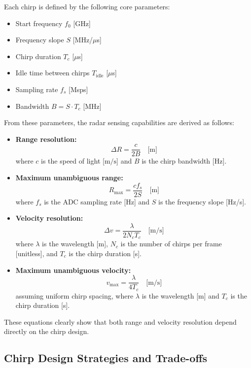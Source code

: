 Each chirp is defined by the following core parameters:
\begin{itemize}
    \item Start frequency $f_0$ [GHz]
    \item Frequency slope $S$ [MHz/$\mu$s]
    \item Chirp duration $T_c$ [$\mu$s]
    \item Idle time between chirps $T_{\text{idle}}$ [$\mu$s]
    \item Sampling rate $f_s$ [Msps]
    \item Bandwidth $B = S \cdot T_c$ [MHz]
\end{itemize}


\hfill

From these parameters, the radar sensing capabilities are derived as follows:

\begin{itemize}
    \item \textbf{Range resolution:} 
    \[
        \Delta R = \frac{c}{2B} \quad \text{[m]}
    \]
    where $c$ is the speed of light [$\text{m/s}$] and $B$ is the chirp bandwidth [Hz].

    \item \textbf{Maximum unambiguous range:} 
    \[
        R_{\text{max}} = \frac{c f_s}{2S} \quad \text{[m]}
    \]
    where $f_s$ is the ADC sampling rate [Hz] and $S$ is the frequency slope [Hz/s].

    \item \textbf{Velocity resolution:} 
    \[
        \Delta v = \frac{\lambda}{2 N_c T_c} \quad \text{[m/s]}
    \]
    where $\lambda$ is the wavelength [m], $N_c$ is the number of chirps per frame [unitless], and $T_c$ is the chirp duration [s].

    \item \textbf{Maximum unambiguous velocity:} 
    \[
        v_{\text{max}} = \frac{\lambda}{4 T_c} \quad \text{[m/s]}
    \]
    assuming uniform chirp spacing, where $\lambda$ is the wavelength [m] and $T_c$ is the chirp duration [s].
\end{itemize}

These equations clearly show that both range and velocity resolution depend directly on the chirp design.

\vspace{1em}
\newpage

\subsection{Chirp Design Strategies and Trade-offs}
\label{sec:chirp-strategies}

